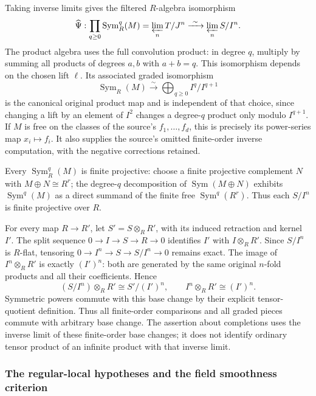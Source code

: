 Taking inverse limits gives the filtered \(R\)-algebra isomorphism \[
\widehat\Psi:\prod_{q\ge0}\operatorname{Sym}_R^q(M)
=\varprojlim_n T/J^n
\xrightarrow{\ \sim\ }\varprojlim_n S/I^n.
\] The product algebra uses the full convolution product: in degree \(q\), multiply by summing all products of degrees \(a,b\) with \(a+b=q\). This isomorphism depends on the chosen lift \(\ell\). Its associated graded isomorphism \[
\operatorname{Sym}_R(M)\xrightarrow{\ \sim\ }\bigoplus_{q\ge0}I^q/I^{q+1}
\] is the canonical original product map and is independent of that choice, since changing a lift by an element of \(I^2\) changes a degree-\(q\) product only modulo \(I^{q+1}\). If \(M\) is free on the classes of the source's \(f_1,\ldots,f_d\), this is precisely its power-series map \(x_i\mapsto f_i\). It also supplies the source's omitted finite-order inverse computation, with the negative corrections retained.

Every \(\operatorname{Sym}_R^q(M)\) is finite projective: choose a finite projective complement \(N\) with \(M\oplus N\cong R^r\); the degree-\(q\) decomposition of \(\operatorname{Sym}(M\oplus N)\) exhibits \(\operatorname{Sym}^q(M)\) as a direct summand of the finite free \(\operatorname{Sym}^q(R^r)\). Thus each \(S/I^n\) is finite projective over \(R\).

For every map \(R\to R'\), let \(S'=S\otimes_RR'\), with its induced retraction and kernel \(I'\). The split sequence \(0\to I\to S\to R\to0\) identifies \(I'\) with \(I\otimes_RR'\). Since \(S/I^n\) is \(R\)-flat, tensoring \(0\to I^n\to S\to S/I^n\to0\) remains exact. The image of \(I^n\otimes_RR'\) is exactly \((I')^n\): both are generated by the same original \(n\)-fold products and all their coefficients. Hence \[
(S/I^n)\otimes_RR'\cong S'/(I')^n,\qquad
I^n\otimes_RR'\cong(I')^n.
\] Symmetric powers commute with this base change by their explicit tensor-quotient definition. Thus all finite-order comparisons and all graded pieces commute with arbitrary base change. The assertion about completions uses the inverse limit of these finite-order base changes; it does not identify ordinary tensor product of an infinite product with that inverse limit.

\subsubsection{The regular-local hypotheses and the field smoothness criterion}\label{the-regular-local-hypotheses-and-the-field-smoothness-criterion}

